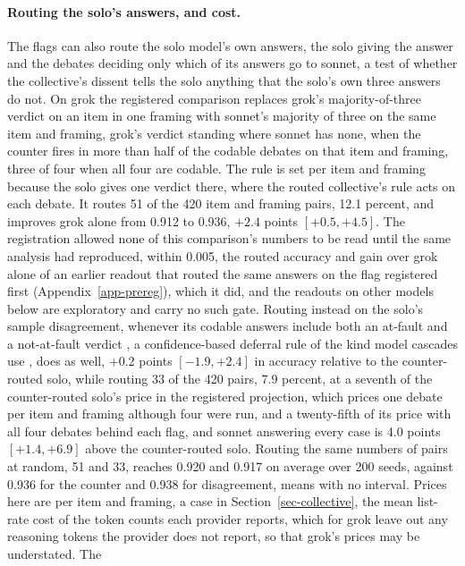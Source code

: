 \paragraph{Routing the solo's answers, and cost.}
The flags can also route the solo model's own answers, the solo giving the
answer and the debates deciding only which of its answers go to sonnet, a
test of whether the collective's dissent tells the solo anything that the
solo's own three answers do not. On grok the registered comparison replaces
grok's majority-of-three verdict on an item in one framing with sonnet's
majority of three on the same item and framing, grok's verdict standing
where sonnet has none, when the counter fires in more than half of the
codable debates on that item and framing, three of four when all four are
codable. The rule is set per item and framing because the solo gives one
verdict there, where the routed collective's rule acts on each debate. It
routes 51 of the 420 item and framing pairs, 12.1 percent, and improves grok
alone from 0.912 to 0.936, $+2.4$ points $[+0.5, +4.5]$.
The registration allowed none of this comparison's numbers to be read until
the same analysis had reproduced, within 0.005, the routed accuracy and gain
over grok alone of an earlier readout that routed the same answers on the
flag registered first (Appendix~\ref{app-prereg}), which it did, and the
readouts on other models below are exploratory and carry no such gate.
Routing instead on
the solo's sample disagreement, whenever its codable answers include both an
at-fault and a not-at-fault verdict
\citep{wang2023selfconsistency,manakul2023selfcheck}, a confidence-based
deferral rule of the kind model cascades use
\citep{jitkrittum2023deferral,gupta2024cascades,yue2024cascades},
does as well, $+0.2$ points $[-1.9, +2.4]$ in accuracy relative to the
counter-routed solo, while routing 33 of the 420 pairs, 7.9 percent, at a
seventh of the counter-routed solo's price in the registered projection,
which prices one debate per item and framing although four were run, and a
twenty-fifth of its price with all four debates behind each flag, and sonnet
answering every case is 4.0 points $[+1.4, +6.9]$ above the counter-routed
solo.
Routing the same numbers of pairs at random, 51 and 33, reaches 0.920 and
0.917 on average over 200 seeds, against 0.936 for the counter and 0.938 for
disagreement, means with no interval.
Prices here are per item and framing, a case in Section~\ref{sec-collective},
the mean list-rate cost of the token
counts each provider reports, which for grok leave out any reasoning tokens
the provider does not report, so that grok's prices may be understated. The
